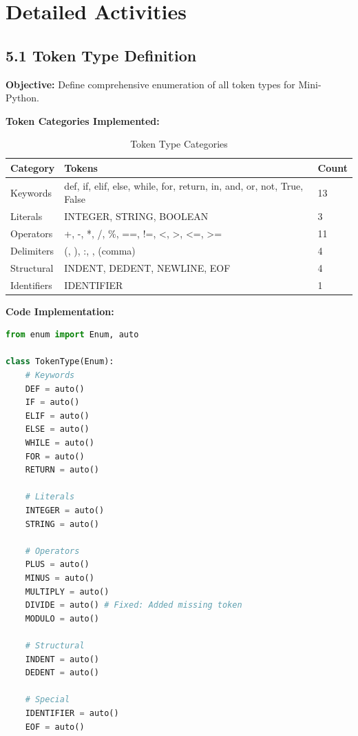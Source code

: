 \documentclass[a4paper,11pt]{article}
\begin{document}
\section{Detailed Activities}

\subsection{5.1 Token Type Definition}

\textbf{Objective:} Define comprehensive enumeration of all token types for Mini-Python.

\textbf{Token Categories Implemented:}

\begin{table}[h]
\centering
\begin{tabularx}{\textwidth}{|l|X|l|}
\hline
\rowcolor{blue!10}
\textbf{Category} & \textbf{Tokens} & \textbf{Count} \\
\hline
Keywords & def, if, elif, else, while, for, return, in, and, or, not, True, False & 13 \\
\hline
Literals & INTEGER, STRING, BOOLEAN & 3 \\
\hline
Operators & +, -, *, /, \%, ==, !=, <, >, <=, >= & 11 \\
\hline
Delimiters & (, ), :, , (comma) & 4 \\
\hline
Structural & INDENT, DEDENT, NEWLINE, EOF & 4 \\
\hline
Identifiers & IDENTIFIER & 1 \\
\hline
\end{tabularx}
\caption{Token Type Categories}
\end{table}



\textbf{Code Implementation:}

\begin{lstlisting}[language=Python, caption=TokenType Enumeration]
from enum import Enum, auto

class TokenType(Enum):
    # Keywords
    DEF = auto()
    IF = auto()
    ELIF = auto()
    ELSE = auto()
    WHILE = auto()
    FOR = auto()
    RETURN = auto()
    
    # Literals
    INTEGER = auto()
    STRING = auto()
    
    # Operators
    PLUS = auto()
    MINUS = auto()
    MULTIPLY = auto()
    DIVIDE = auto() # Fixed: Added missing token
    MODULO = auto()
    
    # Structural
    INDENT = auto()
    DEDENT = auto()
    
    # Special
    IDENTIFIER = auto()
    EOF = auto()
\end{lstlisting}
\end{document}
